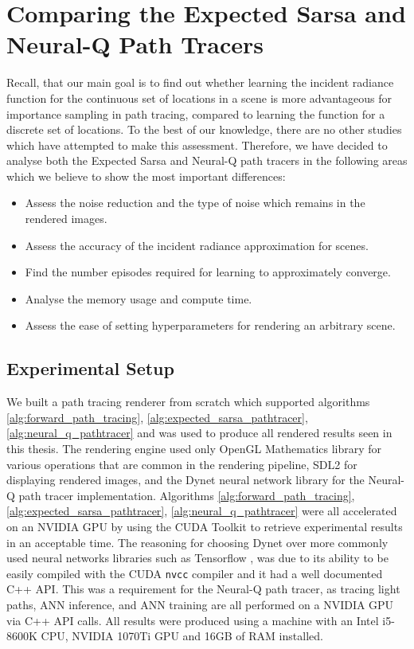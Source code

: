 \documentclass[../dissertation.tex]{subfiles}
\begin{document}
\chapter{Comparing the Expected Sarsa and Neural-Q  Path Tracers}

\label{chap:evaluation}

Recall, that our main goal is to find out whether learning the incident radiance function for the continuous set of locations in a scene is more advantageous for importance sampling in path tracing, compared to learning the function for a discrete set of locations. To the best of our knowledge, there are no other studies which have attempted to make this assessment. Therefore, we have decided to analyse both the Expected Sarsa and Neural-Q path tracers in the following areas which we believe to show the most important differences:

\begin{itemize}
\item Assess the noise reduction and the type of noise which remains in the rendered images.
\item Assess the accuracy of the incident radiance approximation for scenes.
\item Find the number episodes required for learning to approximately converge.
\item Analyse the memory usage and compute time.
\item Assess the ease of setting hyperparameters for rendering an arbitrary scene.
\end{itemize}

\section{Experimental Setup}

We built a path tracing renderer from scratch which supported algorithms \ref{alg:forward_path_tracing}, \ref{alg:expected_sarsa_pathtracer}, \ref{alg:neural_q_pathtracer} and was used to produce all rendered results seen in this thesis. The rendering engine used only OpenGL Mathematics library \cite{glm} for various operations that are common in the rendering pipeline, SDL2 \cite{sdl2} for displaying rendered images, and the Dynet neural network library \cite{dynet} for the Neural-Q path tracer implementation. Algorithms \ref{alg:forward_path_tracing}, \ref{alg:expected_sarsa_pathtracer}, \ref{alg:neural_q_pathtracer} were all accelerated on an NVIDIA GPU by using the CUDA Toolkit \cite{cuda} to retrieve experimental results in an acceptable time. The reasoning for choosing Dynet over more commonly used neural networks libraries such as Tensorflow \cite{tensorflow2015-whitepaper}, was due to its ability to be easily compiled with the CUDA \verb|nvcc| compiler and it had a well documented C++ API. This was a requirement for the Neural-Q path tracer, as tracing light paths, ANN inference, and ANN training are all performed on a NVIDIA GPU via C++ API calls. All results were produced using a machine with an Intel i5-8600K CPU, NVIDIA 1070Ti GPU and 16GB of RAM installed.
\end{document}
